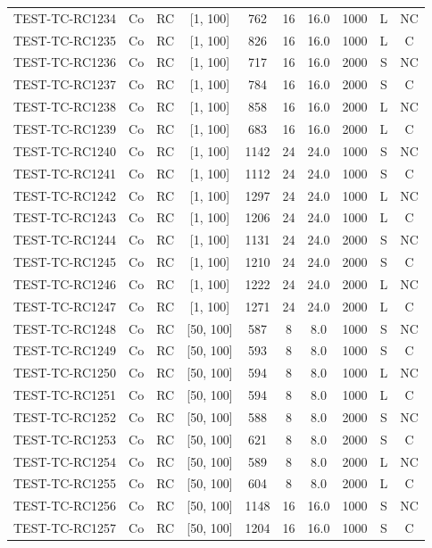 \begin{longtable}{lccccccccc}
TEST-TC-RC1234 & Co & RC & [1, 100] & 762 & 16 & 16.0 & 1000 & L & NC \\
TEST-TC-RC1235 & Co & RC & [1, 100] & 826 & 16 & 16.0 & 1000 & L & C \\
TEST-TC-RC1236 & Co & RC & [1, 100] & 717 & 16 & 16.0 & 2000 & S & NC \\
TEST-TC-RC1237 & Co & RC & [1, 100] & 784 & 16 & 16.0 & 2000 & S & C \\
TEST-TC-RC1238 & Co & RC & [1, 100] & 858 & 16 & 16.0 & 2000 & L & NC \\
TEST-TC-RC1239 & Co & RC & [1, 100] & 683 & 16 & 16.0 & 2000 & L & C \\
TEST-TC-RC1240 & Co & RC & [1, 100] & 1142 & 24 & 24.0 & 1000 & S & NC \\
TEST-TC-RC1241 & Co & RC & [1, 100] & 1112 & 24 & 24.0 & 1000 & S & C \\
TEST-TC-RC1242 & Co & RC & [1, 100] & 1297 & 24 & 24.0 & 1000 & L & NC \\
TEST-TC-RC1243 & Co & RC & [1, 100] & 1206 & 24 & 24.0 & 1000 & L & C \\
TEST-TC-RC1244 & Co & RC & [1, 100] & 1131 & 24 & 24.0 & 2000 & S & NC \\
TEST-TC-RC1245 & Co & RC & [1, 100] & 1210 & 24 & 24.0 & 2000 & S & C \\
TEST-TC-RC1246 & Co & RC & [1, 100] & 1222 & 24 & 24.0 & 2000 & L & NC \\
TEST-TC-RC1247 & Co & RC & [1, 100] & 1271 & 24 & 24.0 & 2000 & L & C \\
TEST-TC-RC1248 & Co & RC & [50, 100] & 587 & 8 & 8.0 & 1000 & S & NC \\
TEST-TC-RC1249 & Co & RC & [50, 100] & 593 & 8 & 8.0 & 1000 & S & C \\
TEST-TC-RC1250 & Co & RC & [50, 100] & 594 & 8 & 8.0 & 1000 & L & NC \\
TEST-TC-RC1251 & Co & RC & [50, 100] & 594 & 8 & 8.0 & 1000 & L & C \\
TEST-TC-RC1252 & Co & RC & [50, 100] & 588 & 8 & 8.0 & 2000 & S & NC \\
TEST-TC-RC1253 & Co & RC & [50, 100] & 621 & 8 & 8.0 & 2000 & S & C \\
TEST-TC-RC1254 & Co & RC & [50, 100] & 589 & 8 & 8.0 & 2000 & L & NC \\
TEST-TC-RC1255 & Co & RC & [50, 100] & 604 & 8 & 8.0 & 2000 & L & C \\
TEST-TC-RC1256 & Co & RC & [50, 100] & 1148 & 16 & 16.0 & 1000 & S & NC \\
TEST-TC-RC1257 & Co & RC & [50, 100] & 1204 & 16 & 16.0 & 1000 & S & C \\

\end{longtable}
